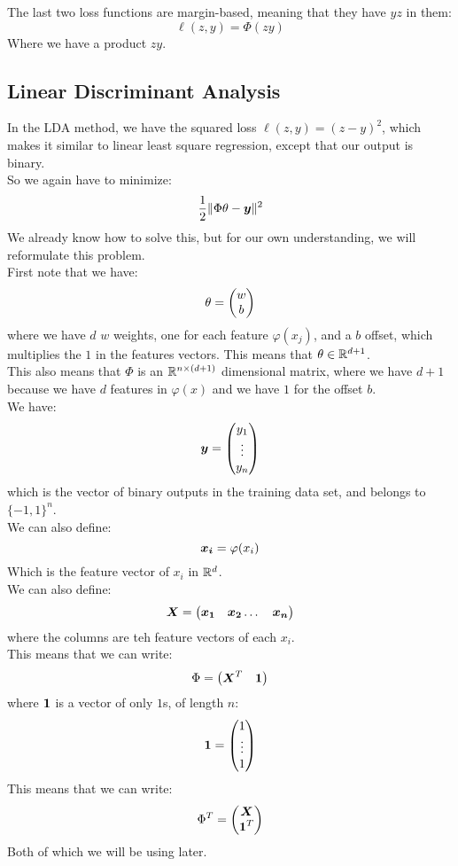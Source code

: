 \documentclass[12pt]{article}
\begin{document}
The last two loss functions are margin-based,
meaning that they have $yz$ in them:
\[ \ell(z, y) = \Phi(zy) \]
Where we have a product $zy$. \\

\newpage

\subsection*{Linear Discriminant Analysis}

In the LDA method, we have the squared 
loss $\ell(z, y) = (z-y)^2$,
which makes it similar to linear least square regression,
except that our output is binary. \\

So we again have to minimize:
\[ \dfrac{1}{2}\|\Phi \theta - \boldsymbol{y}\|^2 \]
We already know how to solve this,
but for our own understanding,
we will reformulate this problem. \\

First note that we have:
\[ \theta = \begin{pmatrix} w \\ b \end{pmatrix} \]
where we have $d$ $w$ weights, one for each feature 
$\varphi(x_j)$, and a $b$ offset,
which multiplies the $1$ in the features vectors.
This means that $\theta \in \mathbb{R}^{d+1}$. \\ 

This also means that $\Phi$ is an 
$\mathbb{R}^{n \times (d+1)}$
dimensional matrix, where we have $d+1$
because we have $d$ features in $\varphi(x)$
and we have $1$ for the offset $b$. \\

We have:
\[ \boldsymbol{y} = \begin{pmatrix} y_1 \\ \vdots \\ y_n \end{pmatrix} \]
which is the vector of binary outputs in the training
data set, and belongs to $\{-1, 1\}^n$. \\

We can also define:
\[ \boldsymbol{x_i} = \varphi(x_i) \]
Which is the feature vector of $x_i$ in $\mathbb{R}^d$. \\
We can also define:
\[ \boldsymbol{X} = \begin{pmatrix} \boldsymbol{x_1} & \boldsymbol{x_2} \dots & \boldsymbol{x_n} \end{pmatrix} \]
where the columns are teh feature vectors of each $x_i$. \\

This means that we can write:
\[ \Phi = \begin{pmatrix} \boldsymbol{X}^T & \boldsymbol{1} \end{pmatrix} \]
where $\boldsymbol{1}$ is a vector of only $1$s, of length $n$:
\[ \boldsymbol{1} = \begin{pmatrix} 1 \\ \vdots \\ 1 \end{pmatrix} \]
This means that we can write:
\[ \Phi^T = \begin{pmatrix} \boldsymbol{X} \\ \boldsymbol{1}^T \end{pmatrix} \]
Both of which we will be using later. \\
\end{document}
